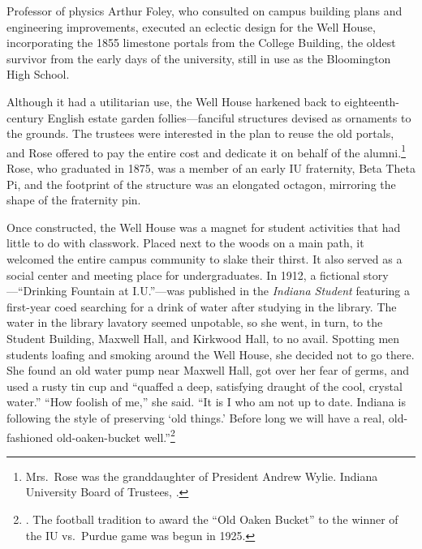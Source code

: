 \documentclass[
  american,
  letterpaper,
]{scrreprt}
\begin{document}
Professor of physics Arthur Foley, who consulted on campus building
plans and engineering improvements, executed an eclectic design for the
Well House, incorporating the 1855 limestone portals from the College
Building, the oldest survivor from the early days of the university,
still in use as the Bloomington High School.

Although it had a utilitarian use, the Well House harkened back to
eighteenth-century English estate garden follies---fanciful structures
devised as ornaments to the grounds. The trustees were interested in the
plan to reuse the old portals, and Rose offered to pay the entire cost
and dedicate it on behalf of the alumni.\footnote{Mrs.~Rose was the
  granddaughter of President Andrew Wylie. Indiana University Board of
  Trustees, .}
Rose, who graduated in 1875, was a member of an early IU fraternity,
Beta Theta Pi, and the footprint of the structure was an elongated
octagon, mirroring the shape of the fraternity pin.

Once constructed, the Well House was a magnet for student activities
that had little to do with classwork. Placed next to the woods on a main
path, it welcomed the entire campus community to slake their thirst. It
also served as a social center and meeting place for undergraduates. In
1912, a fictional story---``Drinking Fountain at I.U.''---was published
in the \emph{Indiana Student} featuring a first-year coed searching for
a drink of water after studying in the library. The water in the library
lavatory seemed unpotable, so she went, in turn, to the Student
Building, Maxwell Hall, and Kirkwood Hall, to no avail. Spotting men
students loafing and smoking around the Well House, she decided not to
go there. She found an old water pump near Maxwell Hall, got over her
fear of germs, and used a rusty tin cup and ``quaffed a deep, satisfying
draught of the cool, crystal water.'' ``How foolish of me,'' she said.
``It is I who am not up to date. Indiana is following the style of
preserving `old things.' Before long we will have a real, old-fashioned
old-oaken-bucket well.''\footnote{.
  The football tradition to award the ``Old Oaken Bucket'' to the winner
  of the IU vs.~Purdue game was begun in 1925.}
\end{document}
